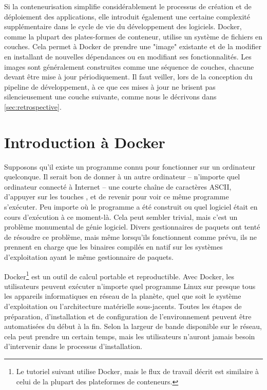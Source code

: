 Si la conteneurisation simplifie considérablement le processus de création et de déploiement des applications, elle introduit également une certaine complexité supplémentaire dans le cycle de vie du développement des logiciels. Docker, comme la plupart des plates-formes de conteneur, utilise un système de fichiers en couches. Cela permet à Docker de prendre une "image" existante et de la modifier en installant de nouvelles dépendances ou en modifiant ses fonctionnalités. Les images sont généralement construites comme une séquence de couches, chacune devant être mise à jour périodiquement. Il faut veiller, lors de la conception du pipeline de développement, à ce que ces mises à jour ne brisent pas silencieusement une couche suivante, comme nous le décrivons dans \autoref{sec:retrospective}.

\section{Introduction à Docker}\label{sec:docker-intro}

Supposons qu'il existe un programme connu pour fonctionner sur un ordinateur quelconque. Il serait bon de donner à un autre ordinateur -- n'importe quel ordinateur connecté à Internet -- une courte chaîne de caractères ASCII, d'appuyer sur les touches \keys{\return}, et de revenir pour voir ce même programme s'exécuter. Peu importe où le programme a été construit ou quel logiciel était en cours d'exécution à ce moment-là. Cela peut sembler trivial, mais c'est un problème monumental de génie logiciel. Divers gestionnaires de paquets ont tenté de résoudre ce problème, mais même lorsqu'ils fonctionnent comme prévu, ils ne prennent en charge que les binaires compilés en natif sur les systèmes d'exploitation ayant le même gestionnaire de paquets.

Docker\footnote{Le tutoriel suivant utilise Docker, mais le flux de travail décrit est similaire à celui de la plupart des plateformes de conteneurs.} est un outil de calcul portable et reproductible. Avec Docker, les utilisateurs peuvent exécuter n'importe quel programme Linux sur presque tous les appareils informatiques en réseau de la planète, quel que soit le système d'exploitation ou l'architecture matérielle sous-jacents. Toutes les étapes de préparation, d'installation et de configuration de l'environnement peuvent être automatisées du début à la fin. Selon la largeur de bande disponible sur le réseau, cela peut prendre un certain temps, mais les utilisateurs n'auront jamais besoin d'intervenir dans le processus d'installation.

